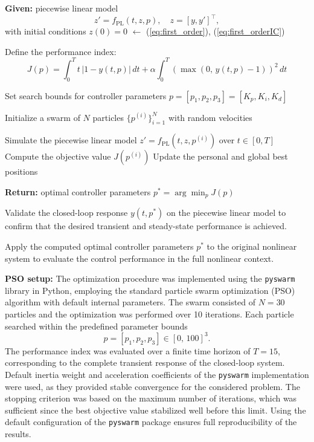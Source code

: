 \documentclass[preprint,12pt]{elsarticle}
\begin{document}
\begin{algorithm}[H]
\caption{PSO-based optimal tuning of controller parameters for a piecewise linear system}
\begin{algorithmic}[1]
    \State \textbf{Given:} piecewise linear model 
    \[
    {z}' = f_{\mathrm{PL}}(t, z, p), \quad 
    z = [y, {y}']^\top,
    \]
    with initial conditions \( z(0) = 0 \) 
    \hfill $\leftarrow$ (\ref{eq:first_order}), (\ref{eq:first_orderIC})
    
    \State Define the performance index:
    \[
    J(p) = \int_0^T t\,|1 - y(t, p)|\,dt 
    + \alpha \int_0^T (\max(0,\, y(t,p) - 1))^2\,dt
    \]
    
    \State Set search bounds for controller parameters 
    \( p = [p_1, p_2, p_3] = [K_p, K_i, K_d] \)
    
    \State Initialize a swarm of \( N \) particles 
    \( \{p^{(i)}\}_{i=1}^{N} \) with random velocities
    
            \State Simulate the piecewise linear model 
            \({z}' = f_{\mathrm{PL}}(t, z, p^{(i)})\) over \(t \in [0, T]\)
            \State Compute the objective value \(J(p^{(i)})\)
            \State Update the personal and global best positions
        \EndFor
    \EndFor
    
    \State \textbf{Return:} optimal controller parameters 
    \( p^\ast = \arg\min_p J(p) \)
    
    \State Validate the closed-loop response \( y(t, p^\ast) \) on the piecewise linear model to confirm that the desired transient and steady-state performance is achieved.
    
    \State Apply the computed optimal controller parameters \( p^\ast \) to the original nonlinear system to evaluate the control performance in the full nonlinear context.
\end{algorithmic}
\label{alg:pso_tuning}
\end{algorithm}
\noindent
\textbf{PSO setup:} 
The optimization procedure was implemented using the \texttt{pyswarm} library in Python, employing the standard particle swarm optimization (PSO) algorithm with default internal parameters. 
The swarm consisted of $N = 30$ particles and the optimization was performed over 10 iterations. 
Each particle searched within the predefined parameter bounds 
\[
p = [p_1, p_2, p_3] \in [0,\,100]^3.
\]
The performance index was evaluated over a finite time horizon of $T = 15$, corresponding to the complete transient response of the closed-loop system. 
Default inertia weight and acceleration coefficients of the \texttt{pyswarm} implementation were used, as they provided stable convergence for the considered problem. 
The stopping criterion was based on the maximum number of iterations, which was sufficient since the best objective value stabilized well before this limit. 
Using the default configuration of the \texttt{pyswarm} package ensures full reproducibility of the results. 
\end{document}
